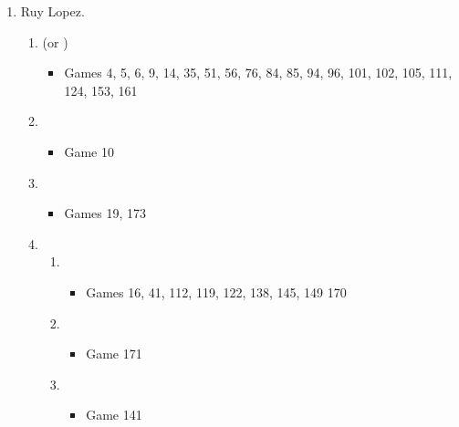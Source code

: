 \begin{enumerate}
\begin{enumerate}
\item \newgame{}
\begin{itemize}
\item Games 8, 29
\end{itemize}

\item \newgame{}
\begin{itemize}
\item Game 125
\end{itemize}
\end{enumerate}


\item Ruy Lopez. \\
\newgame{}
\begin{enumerate}
\item {} (or )
\begin{itemize}
\item Games 4, 5, 6, 9, 14, 35, 51, 56, 76, 84, 85, 94, 96, 101, 102, 105, 111, 124, 153, 161
\end{itemize}
\item {}
\begin{itemize}
\item Game 10
\end{itemize}
\item {}
\begin{itemize}
\item Games 19, 173
\end{itemize}

\item {}
\begin{enumerate}
\item {}
\begin{itemize}
\item Games 16, 41, 112, 119, 122, 138, 145, 149 170
\end{itemize}

\item {}
\begin{itemize}
\item Game 171
\end{itemize}

\item {}
\begin{itemize}
\item Game 141
\end{itemize}


\end{enumerate}
\end{enumerate}
\end{enumerate}
